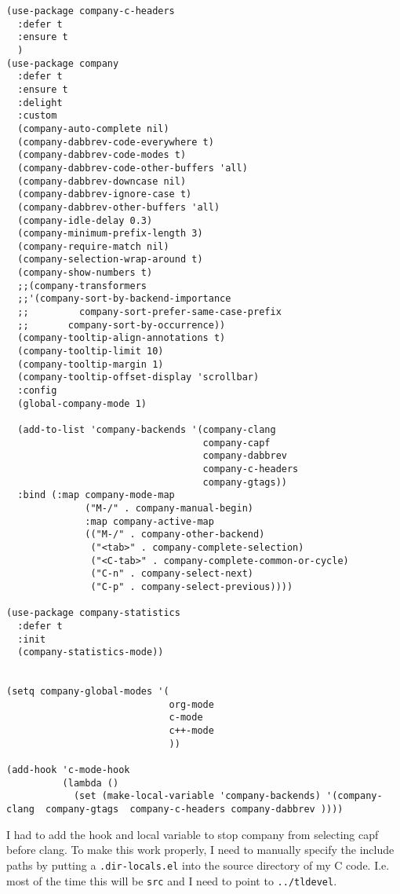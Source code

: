 \documentclass[12pt]{article}
\begin{document}
\begin{verbatim}
(use-package company-c-headers
  :defer t
  :ensure t
  )
(use-package company
  :defer t
  :ensure t
  :delight
  :custom
  (company-auto-complete nil)
  (company-dabbrev-code-everywhere t)
  (company-dabbrev-code-modes t)
  (company-dabbrev-code-other-buffers 'all)
  (company-dabbrev-downcase nil)
  (company-dabbrev-ignore-case t)
  (company-dabbrev-other-buffers 'all)
  (company-idle-delay 0.3)
  (company-minimum-prefix-length 3)
  (company-require-match nil)
  (company-selection-wrap-around t)
  (company-show-numbers t)
  ;;(company-transformers
  ;;'(company-sort-by-backend-importance
  ;;         company-sort-prefer-same-case-prefix
  ;;       company-sort-by-occurrence))
  (company-tooltip-align-annotations t)
  (company-tooltip-limit 10)
  (company-tooltip-margin 1)
  (company-tooltip-offset-display 'scrollbar)
  :config
  (global-company-mode 1)

  (add-to-list 'company-backends '(company-clang
                                   company-capf
                                   company-dabbrev
                                   company-c-headers
                                   company-gtags))
  :bind (:map company-mode-map
              ("M-/" . company-manual-begin)
              :map company-active-map
              (("M-/" . company-other-backend)
               ("<tab>" . company-complete-selection)
               ("<C-tab>" . company-complete-common-or-cycle)
               ("C-n" . company-select-next)
               ("C-p" . company-select-previous))))

(use-package company-statistics
  :defer t
  :init
  (company-statistics-mode))


(setq company-global-modes '(
                             org-mode
                             c-mode
                             c++-mode
                             ))

(add-hook 'c-mode-hook
          (lambda ()
            (set (make-local-variable 'company-backends) '(company-clang  company-gtags  company-c-headers company-dabbrev ))))

\end{verbatim}

I had to add the hook and local variable to stop company from selecting capf before clang.
To make this work properly, I need to manually specify the include paths by
putting a \texttt{.dir-locals.el} into the source directory of my C code. I.e. most
of the time this will be \texttt{src} and I need to point to
\texttt{../tldevel}.
\end{document}
